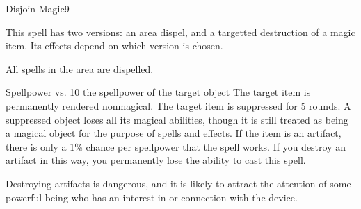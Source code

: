 \begin{spellsection}{Disjoin Magic}{9}
    \begin{spellheader}
    \end{spellheader}
    \begin{spellcontent}
        \begin{spelltargetinginfo}
            \spellspecial This spell has two versions: an area dispel, and a targetted destruction of a magic item. Its effects depend on which version is chosen.
        \end{spelltargetinginfo}
    \end{spellcontent}
    \begin{spellsubcontent}
        \begin{spelltargetinginfo}
        \end{spelltargetinginfo}
        \begin{spelleffects}
            \spelleffect All spells in the area are dispelled.
        \end{spelleffects}
    \end{spellsubcontent}
    \begin{spellsubcontent}
        \begin{spelltargetinginfo}
        \end{spelltargetinginfo}
        \begin{spelleffects}
            \begin{spellattack}{Spellpower vs. 10 \add the spellpower of the target object}
                \spellsuccess The target item is permanently rendered nonmagical.
                \spellfailure The target item is suppressed for 5 rounds. A suppressed object loses all its magical abilities, though it is still treated as being a magical object for the purpose of spells and effects.
                \spellspecial If the item is an artifact, there is only a 1\% chance per spellpower that the spell works. If you destroy an artifact in this way, you permanently lose the ability to cast this spell.
            \end{spellattack}
        \end{spelleffects}
    \end{spellsubcontent}
    \begin{spellfooter}
        \spellnotes Destroying artifacts is dangerous, and it is likely to attract the attention of some powerful being who has an interest in or connection with the device.
        \miscastyou
    \end{spellfooter}
\end{spellsection}

